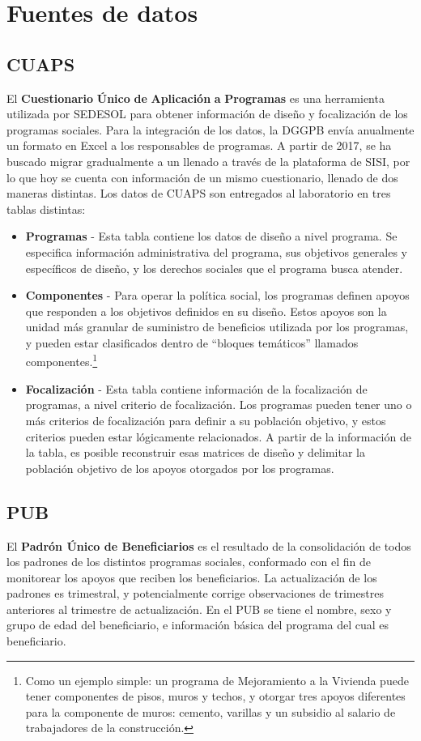 \chapter{Fuentes de datos}

\section{CUAPS}
El \textbf{Cuestionario} \textbf{Único} \textbf{de} \textbf{Aplicación} \textbf{a} \textbf{Programas} es una herramienta utilizada por SEDESOL para obtener información de diseño y focalización de  los programas sociales. Para la integración de los datos, la DGGPB envía anualmente un formato en Excel a los responsables de programas. A partir de 2017, se ha buscado migrar gradualmente a un llenado a través de la plataforma de SISI, por lo que hoy se cuenta con información de un mismo cuestionario, llenado de dos maneras distintas. Los datos de CUAPS son entregados al laboratorio en tres tablas distintas:
\begin{itemize}
    \item \textbf{Programas} - Esta tabla contiene los datos de diseño a nivel programa. Se especifica información administrativa del programa, sus objetivos generales y específicos de diseño, y los derechos sociales que el programa busca atender.
    \item \textbf{Componentes} - Para operar la política social, los programas definen apoyos que responden a los objetivos definidos en su diseño. Estos apoyos son la unidad más granular de suministro de beneficios utilizada por los programas, y pueden estar clasificados dentro de “bloques temáticos” llamados componentes.\footnote{Como un ejemplo simple: un programa de Mejoramiento a la Vivienda puede tener componentes de pisos, muros y techos, y otorgar tres apoyos diferentes para la componente de muros: cemento, varillas y un subsidio al salario de trabajadores de la construcción.}
    \item \textbf{Focalización} - Esta tabla contiene información de la focalización de programas, a nivel criterio de focalización. Los programas pueden tener uno o más criterios de focalización para definir a su población objetivo, y estos criterios pueden estar lógicamente relacionados. A partir de la información de la tabla, es posible reconstruir esas matrices de diseño y delimitar la población objetivo de los apoyos otorgados por los programas.
\end{itemize}
\section{PUB}
El \textbf{Padrón Único de Beneficiarios} es el resultado de la consolidación de todos los padrones de los distintos programas sociales, conformado con el fin de monitorear los apoyos que reciben los beneficiarios. La actualización de los padrones es trimestral, y potencialmente corrige observaciones de trimestres anteriores al trimestre de actualización. En el PUB se tiene el nombre, sexo y grupo de edad del beneficiario, e información básica del programa del cual es beneficiario.
